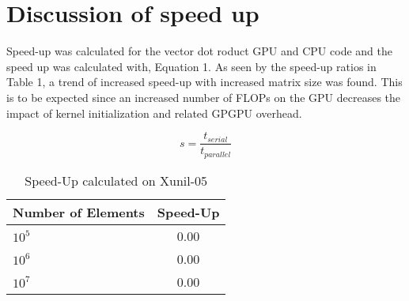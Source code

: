 \documentclass[12pt]{article}
\begin{document}
\pagebreak
\vspace{-0.6cm}
\section{Discussion of speed up}
\vspace{-0.4cm}

\qquad Speed-up was calculated for the vector dot roduct GPU and CPU code
and the speed up was calculated with, Equation 1. 
As seen by the speed-up ratios in Table 1, a trend of increased speed-up
with increased matrix size was found. This is to be expected since
an increased number of FLOPs on the GPU decreases the impact of kernel initialization
and related GPGPU overhead.

\begin{equation}
    s = \frac{t_{serial}}{t_{parallel}}\label{eq1}
\end{equation}

\begin{table}[H]
\centering
\begin{tabular}{@{}|l|c|}
\hline
Number of Elements& Speed-Up \\ \hline
$10^5$  & 0.00  \\ \hline 
$10^6$  & 0.00  \\ \hline 
$10^7$  & 0.00  \\ \hline 
\end{tabular}
\caption{Speed-Up calculated on Xunil-05}
\end{table}
\end{document}

